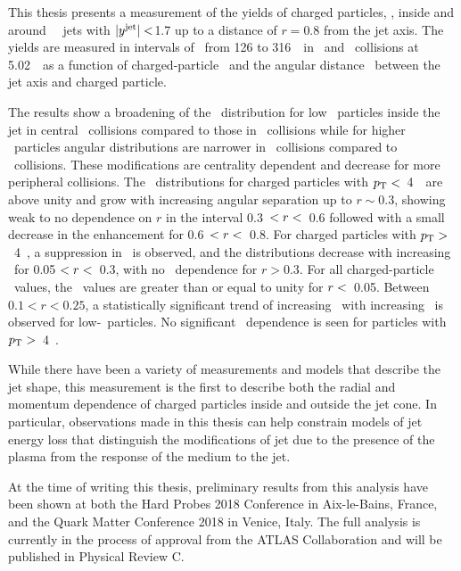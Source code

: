 
This thesis presents a measurement of the yields of charged particles, \Dptr, inside and around \RFour\ \antikt\ jets with $|\mbox{$y^{\mathrm{jet}}$}| <$1.7 up to a distance of $r = 0.8$ from the jet axis.
The yields are measured in intervals of \ptjet\ from 126 to 316~\GeV\ in \PbPb\ and \pp\ collisions at 5.02~\TeV\ as a function of charged-particle \pt\ and the angular distance \rvar\ between the jet axis and charged particle.

The results show a broadening of the \Dptr\ distribution for low \pt\ particles inside the jet in central \pbpb\ collisions compared to those in \pp\ collisions while for higher \pt\ particles angular distributions are narrower in \pbpb\ collisions compared to \pp\ collisions.
These modifications are centrality dependent and decrease for more peripheral collisions.
The \RDptr\ distributions for charged particles with $\mbox{$p_{\mathrm{T}}$} <$~4~\GeV\ are above unity and grow with increasing angular separation up to $r \sim0.3$, showing weak to no dependence on $r$ in the interval 0.3~$< \mbox{$r$} <$~0.6 followed with a small decrease in the enhancement for 0.6~$< \mbox{$r$} <$~0.8.
For charged particles with $\mbox{$p_{\mathrm{T}}$} >$~4~\GeV, a suppression in \RDptr\ is observed, and the distributions decrease with increasing \rvar\ for 0.05 $ < \mbox{$r$} < $~0.3, with no \rvar\ dependence for $r>0.3$.
For all charged-particle \pt\ values, the \RDptr\ values are greater than or equal to unity for $\mbox{$r$} <$~0.05.
Between $0.1 < r < 0.25$, a statistically significant trend of increasing \RDptr\ with increasing \ptjet\ is observed for low-\pt\ particles.
No significant \ptjet\ dependence is seen for particles  with $\mbox{$p_{\mathrm{T}}$} >$~4~\GeV.

While there have been a variety of measurements and models that describe the jet shape, this measurement is the first to describe both the radial and momentum dependence of charged particles inside and outside the jet cone. In particular, observations made in this thesis can help constrain models of jet energy loss that distinguish the modifications of jet due to the presence of the plasma from the response of the medium to the jet.

At the time of writing this thesis, preliminary results from this analysis have been shown at both the Hard Probes 2018 Conference in Aix-le-Bains, France, and the Quark Matter Conference 2018 in Venice, Italy. The full analysis is currently in the process of approval from the ATLAS Collaboration and will be published in Physical Review C.